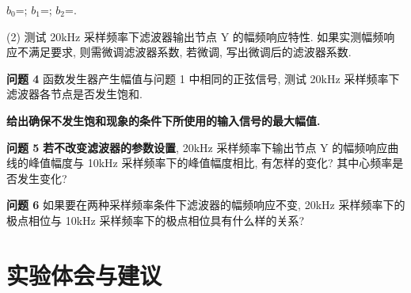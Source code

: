 \documentclass{dspreport}
\begin{document}
\phantom{参数为:} $b_0$=\underline{\blank{  }}; $b_1$=\underline{\blank{  }}; $b_2$=\underline{\blank{  }}.

\noindent(2) 测试 20kHz 采样频率下滤波器输出节点 Y 的幅频响应特性. 如果实测幅频响应不满足要求, 则需微调滤波器系数, 若微调, 写出微调后的滤波器系数.

\begin{block}

\end{block}

\noindent\textbf{问题 4} 函数发生器产生幅值与问题 1 中相同的正弦信号, 测试 20kHz 采样频率下滤波器各节点是否发生饱和.

\begin{block}

\end{block}

\noindent\textbf{给出确保不发生饱和现象的条件下所使用的输入信号的最大幅值.}

\begin{block}

\end{block}

\noindent\textbf{问题 5} \textbf{若不改变滤波器的参数设置}, 20kHz 采样频率下输出节点 Y 的幅频响应曲线的峰值幅度与 10kHz 采样频率下的峰值幅度相比, 有怎样的变化? 其中心频率是否发生变化?

\begin{block}

\end{block}

\noindent\textbf{问题 6} 如果要在两种采样频率条件下滤波器的幅频响应不变, 20kHz 采样频率下的极点相位与 10kHz 采样频率下的极点相位具有什么样的关系?

\begin{block}

\end{block}

\section{实验体会与建议}
\begin{block}

\end{block}
\end{document}
